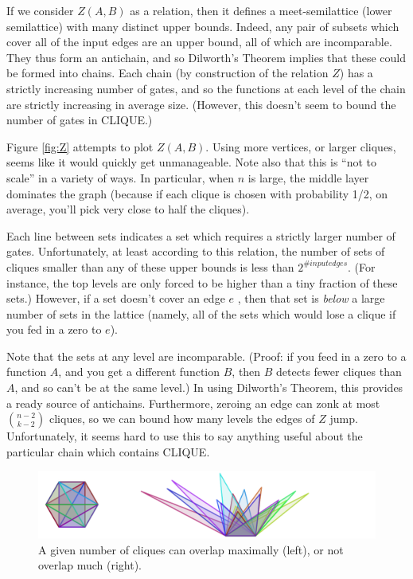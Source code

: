 \documentclass[12pt]{article}
\theoremstyle{definition}
\begin{document}
If we consider $Z(A, B)$ as a relation, then it defines a meet-semilattice
(lower semilattice) with 
many distinct upper bounds.  Indeed, any pair of subsets which
cover all of the input edges are an upper bound, all of which
are incomparable. They thus form an antichain, and so Dilworth's Theorem
implies that these could be formed into chains. Each chain (by construction
of the relation $Z$) has a strictly increasing number of gates, and so the
functions at each level of the chain are strictly increasing in average
size. (However, this doesn't seem to bound the number of gates in CLIQUE.)

Figure \ref{fig:Z} attempts to plot $Z(A,B)$. Using more vertices, or
larger cliques, seems like it would quickly get unmanageable.
Note also that this is ``not to scale'' in a variety of ways. In
particular, when $n$ is large, the middle layer dominates the graph
(because if each clique is chosen with probability 1/2, on average,
you'll pick very close to half the cliques).

Each line between sets indicates a set which requires a strictly larger number of gates.  Unfortunately, at least according to this relation,
the number of sets of cliques smaller than
any of these upper bounds is less than $2^{\# input edges}$.
(For instance, the top levels are only forced to be higher than
a tiny fraction of these sets.) However, if a set doesn't cover an edge $e$ ,
then that set is {\em below} a large number of sets in the lattice (namely,
all of the sets which would lose a clique if you fed in a zero to $e$).

Note that the sets at any level are incomparable. (Proof: if you feed in
a zero to a function $A$, and you get a different function $B$, then $B$
detects fewer cliques than $A$, and so can't be at the same level.)
In using Dilworth's Theorem, this provides a ready source of antichains.
Furthermore, zeroing an edge
can zonk at most ${n-2} \choose {k-2}$ cliques, so we can bound how
many levels the edges of $Z$ jump. Unfortunately, it seems hard to use
this to say anything useful about the particular chain which contains CLIQUE.

\begin{figure}
\centering
\includegraphics[width=1\textwidth]{R/tri1.pdf}
\caption{A given number of cliques can overlap maximally (left),
or not overlap much (right).}
\label{fig:overlappingTriangles}
\end{figure}
\end{document}
